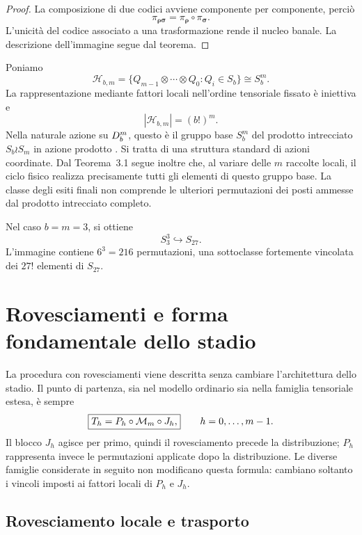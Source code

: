 	\begin{proof}
		La composizione di due codici avviene componente per componente, perciò
		\[
		\pi_{\boldsymbol{\rho}\boldsymbol{\sigma}}
		=
		\pi_{\boldsymbol{\rho}}\circ\pi_{\boldsymbol{\sigma}}.
		\]
		L'unicità del codice associato a una trasformazione rende il nucleo banale.
		La descrizione dell'immagine segue dal teorema.
	\end{proof}

	Poniamo
	\[
	\mathcal H_{b,m}=\{Q_{m-1}\otimes\cdots\otimes Q_0:Q_i\in S_b\}
	\cong S_b^m.
	\]
	La rappresentazione mediante fattori locali nell'ordine tensoriale fissato è
	iniettiva e
	\[
	|\mathcal H_{b,m}|=(b!)^m.
	\]
	Nella naturale azione su \(D_b^m\), questo è il gruppo base \(S_b^m\)
	del prodotto intrecciato \(S_b\wr S_m\) in azione prodotto
	\cite[sezione~1.1]{praeger-schneider}. Si tratta di una struttura standard
	di azioni coordinate. Dal Teorema~3.1 segue inoltre che, al variare delle
	\(m\) raccolte locali, il ciclo fisico realizza precisamente tutti gli
	elementi di questo gruppo base. La classe degli esiti finali non comprende le
	ulteriori permutazioni dei posti ammesse dal prodotto intrecciato completo.

	Nel caso \(b=m=3\), si ottiene
	\[
	S_3^3\hookrightarrow S_{27}.
	\]
	L'immagine contiene \(6^3=216\) permutazioni, una sottoclasse fortemente
	vincolata dei \(27!\) elementi di \(S_{27}\).

	
\section{Rovesciamenti e forma fondamentale dello stadio}

	La procedura con rovesciamenti viene descritta senza cambiare
	l'architettura dello stadio. Il punto di partenza, sia nel modello ordinario
	sia nella famiglia tensoriale estesa, è sempre
	\[
	\boxed{
	T_h
	=
	P_h\circ\mathcal M_m\circ J_h,
	}
	\qquad
	h=0,\dots,m-1.
	\]
	Il blocco \(J_h\) agisce per primo, quindi il rovesciamento precede la
	distribuzione; \(P_h\) rappresenta invece le permutazioni applicate dopo la
	distribuzione. Le diverse famiglie considerate in seguito non modificano
	questa formula: cambiano soltanto i vincoli imposti ai fattori locali di
	\(P_h\) e \(J_h\).

	\subsection{Rovesciamento locale e trasporto}

